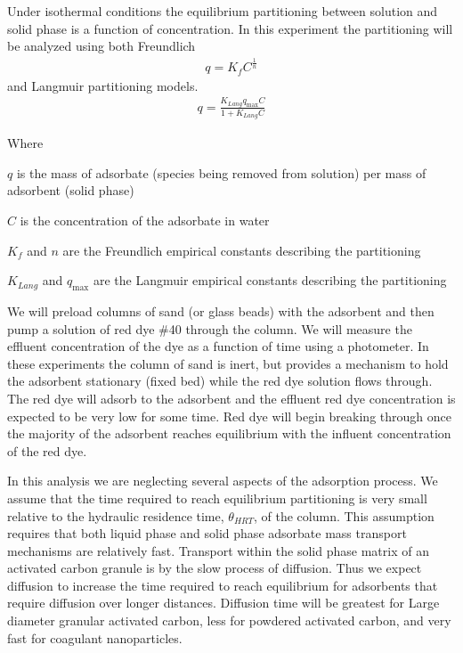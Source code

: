 \documentclass[letterpaper,10pt,english]{sphinxmanual}
\begin{document}
Under isothermal conditions the equilibrium partitioning between solution and solid phase is a function of concentration. In this experiment the partitioning will be analyzed using both Freundlich
\begin{equation}\label{equation:Adsorption/Adsorption:Freundlich}
\begin{split} q =K_f C^{\frac{1}{n}}\end{split}
\end{equation}
and Langmuir partitioning models.
\begin{equation}\label{equation:Adsorption/Adsorption:Langmuir}
\begin{split} q =\frac{K_{Lang}q_{\max} C}{1+K_{Lang}C}\end{split}
\end{equation}
\begin{DUlineblock}{0em}
\item[] Where
\item[] \(q\) is the mass of adsorbate (species being removed from solution) per mass of adsorbent (solid phase)
\item[] \(C\) is the concentration of the adsorbate in water
\item[] \(K_f\) and \(n\) are the Freundlich empirical constants describing the partitioning
\item[] \(K_{Lang}\) and \(q_{\max}\) are the Langmuir empirical constants describing the partitioning
\end{DUlineblock}

We will preload columns of sand (or glass beads) with the adsorbent and then pump a solution of red dye \#40 through the column. We will measure the effluent concentration of the dye as a function of time using a photometer. In these experiments the column of sand is inert, but provides a mechanism to hold the adsorbent stationary (fixed bed) while the red dye solution flows through. The red dye will adsorb to the adsorbent and the effluent red dye concentration is expected to be very low for some time. Red dye will begin breaking through once the majority of the adsorbent reaches equilibrium with the influent concentration of the red dye.

In this analysis we are neglecting several aspects of the adsorption process. We assume that the time required to reach equilibrium partitioning is very small relative to the hydraulic residence time, \(\theta_{HRT}\), of the column. This assumption requires that both liquid phase and solid phase adsorbate mass transport mechanisms are relatively fast. Transport within the solid phase matrix of an activated carbon granule is by the slow process of diffusion. Thus we expect diffusion to increase the time required to reach equilibrium for adsorbents that require diffusion over longer distances. Diffusion time will be greatest for Large diameter granular activated carbon, less for powdered activated carbon, and very fast for coagulant nanoparticles.
\end{document}
